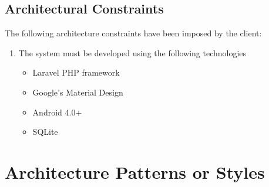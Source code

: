 \documentclass[hidelinks,a4paper,12pt]{article}
\begin{document}
\subsection{Architectural Constraints}		
	The following architecture constraints have been imposed by the client:
		\begin{enumerate}
			\item The system must be developed using the following technologies
			\begin{itemize}
				\item Laravel PHP framework
				\item Google's Material Design
				\item Android 4.0+
				\item SQLite
			\end{itemize}
		\end{enumerate}

\section{Architecture Patterns or Styles}
\end{document}

